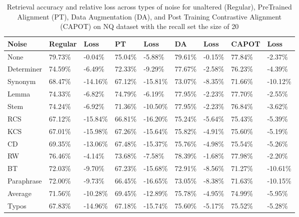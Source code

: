 \begin{table*}[!ht]
    \centering
    \begin{tabular}{|l|l|l|l|l|l|l|l|l|}
    \hline
        Noise & Regular & Loss & PT & Loss & DA & Loss & CAPOT & Loss \\ \hline
        None & 79.73\% & -0.04\% & 75.04\% & -5.88\% & 79.61\% & -0.15\% & 77.84\% & -2.37\% \\ \hline
        Determiner & 74.59\% & -6.49\% & 72.33\% & -9.29\% & 77.67\% & -2.58\% & 76.23\% & -4.39\% \\ \hline
        Synonym & 68.47\% & -14.16\% & 67.12\% & -15.81\% & 73.07\% & -8.35\% & 71.66\% & -10.12\% \\ \hline
        Lemma & 74.33\% & -6.82\% & 74.79\% & -6.19\% & 77.95\% & -2.23\% & 77.70\% & -2.55\% \\ \hline
        Stem & 74.24\% & -6.92\% & 71.36\% & -10.50\% & 77.95\% & -2.23\% & 76.84\% & -3.62\% \\ \hline
        RCS & 67.12\% & -15.84\% & 66.81\% & -16.20\% & 75.24\% & -5.64\% & 75.43\% & -5.39\% \\ \hline
        KCS & 67.01\% & -15.98\% & 67.26\% & -15.64\% & 75.82\% & -4.91\% & 75.60\% & -5.19\% \\ \hline
        CD & 69.35\% & -13.06\% & 67.48\% & -15.37\% & 75.76\% & -4.98\% & 75.54\% & -5.26\% \\ \hline
        RW & 76.46\% & -4.14\% & 73.68\% & -7.58\% & 78.39\% & -1.68\% & 77.98\% & -2.20\% \\ \hline
        BT & 72.03\% & -9.70\% & 67.23\% & -15.68\% & 72.91\% & -8.56\% & 71.27\% & -10.61\% \\ \hline
        Paraphrase & 72.00\% & -9.73\% & 66.45\% & -16.65\% & 73.05\% & -8.38\% & 71.63\% & -10.15\% \\ \hline
        Average & 71.56\% & -10.28\% & 69.45\% & -12.89\% & 75.78\% & -4.95\% & 74.99\% & -5.95\% \\ \hline
        Typos & 67.83\% & -14.96\% & 67.18\% & -15.74\% & 75.60\% & -5.17\% & 75.52\% & -5.28\% \\ \hline
    \end{tabular}
    \caption{Retrieval accuracy and relative loss across types of noise for unaltered (Regular), PreTrained Alignment (PT),  Data Augmentation (DA), and Post Training Contrastive Alignment (CAPOT) on NQ dataset with the recall set the size of 20}
    \label{tab:capot-nq-20}
\end{table*}
